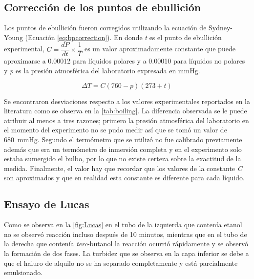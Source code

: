 \documentclass[11pt,letterpaper]{article}
\begin{document}

\subsection{Corrección de los puntos de ebullición}

Los puntos de ebullición fueron corregidos utilizando la ecuación de Sydney-Young\autocite{young:1902} (Ecuación \ref{eq:bpcorrection}). En donde \textit{t} es el punto de ebullición experimental, $C = \dfrac{dP}{dt} \times \dfrac{1}{T}$ es un valor aproximadamente constante que puede aproximarse a \num{0.00012} para líquidos polares y a \num{0.00010} para líquidos no polares y \textit{p} es la presión atmosférica del laboratorio expresada en mmHg.

\begin{equation}
\label{eq:bpcorrection}
\Delta T = C(760 - p)(273 + t)
\end{equation}

Se encontraron desviaciones respecto a los valores experimentales reportados en la literatura como se observa en la \ref{tab:boiling}. La diferencia observada se le puede atribuir al menos a tres razones; primero la presión atmosférica del laboratorio en el momento del experimento no se pudo medir así que se tomó un valor de \SI{680}{\mmHg}. Segundo el termómetro que se utilizó no fue calibrado previamente además que era un termómetro de inmersión completa y en el experimento solo estaba sumergido el bulbo, por lo que no existe certeza sobre la exactitud de la medida. Finalmente, el valor hay que recordar que los valores de la constante \textit{C} son aproximados y que en realidad esta constante es diferente para cada líquido.

\subsection{Ensayo de Lucas}

Como se observa en la \ref{fig:Lucas} en el tubo de la izquierda que contenía etanol no se observó reacción incluso después de 10 minutos, mientras que en el tubo de la derecha que contenía \textit{terc}-butanol la reacción ocurrió rápidamente y se observó la formación de dos fases. La turbidez que se observa en la capa inferior se debe a que el haluro de alquilo no se ha separado completamente y está parcialmente emulsionado. 
\end{document}
